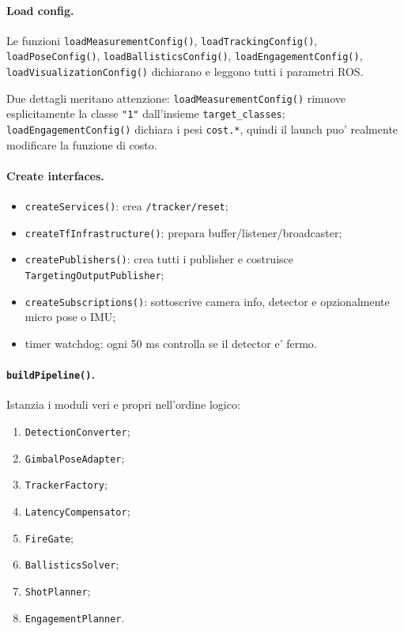 \documentclass[11pt,a4paper]{article}
\newcommand{\code}[1]{\texttt{#1}}
\newcommand{\topic}[1]{\texttt{#1}}
\begin{document}
\paragraph{Load config.}
Le funzioni \code{loadMeasurementConfig()}, \code{loadTrackingConfig()}, \code{loadPoseConfig()}, \code{loadBallisticsConfig()}, \code{loadEngagementConfig()}, \code{loadVisualizationConfig()} dichiarano e leggono tutti i parametri ROS.

Due dettagli meritano attenzione: \code{loadMeasurementConfig()} rimuove esplicitamente la classe \code{"1"} dall'insieme \code{target\_classes}; \code{loadEngagementConfig()} dichiara i pesi \code{cost.*}, quindi il launch puo' realmente modificare la funzione di costo.

\paragraph{Create interfaces.}
\begin{itemize}[leftmargin=1.4em]
  \item \code{createServices()}: crea \topic{/tracker/reset};
  \item \code{createTfInfrastructure()}: prepara buffer/listener/broadcaster;
  \item \code{createPublishers()}: crea tutti i publisher e costruisce \code{TargetingOutputPublisher};
  \item \code{createSubscriptions()}: sottoscrive camera info, detector e opzionalmente micro pose o IMU;
  \item timer watchdog: ogni 50 ms controlla se il detector e' fermo.
\end{itemize}

\paragraph{\code{buildPipeline()}.}
Istanzia i moduli veri e propri nell'ordine logico:
\begin{enumerate}[leftmargin=1.4em]
  \item \code{DetectionConverter};
  \item \code{GimbalPoseAdapter};
  \item \code{TrackerFactory};
  \item \code{LatencyCompensator};
  \item \code{FireGate};
  \item \code{BallisticsSolver};
  \item \code{ShotPlanner};
  \item \code{EngagementPlanner}.
\end{enumerate}
\end{document}
